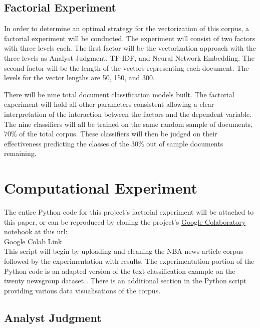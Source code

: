 \documentclass[5p,authoryear]{elsarticle}
\begin{document}
\subsection{Factorial Experiment}\label{dependent}

In order to determine an optimal strategy for the vectorization of this corpus, a factorial experiment will be conducted. The experiment will consist of two factors with three levels each. The first factor will be the vectorization approach with the three levels as Analyst Judgment, TF-IDF, and Neural Network Embedding. The second factor will be the length of the vectors representing each document. The levels for the vector lengths are 50, 150, and 300.

There will be nine total document classification models built. The factorial experiment will hold all other parameters consistent allowing a clear interpretation of the interaction between the factors and the dependent variable. The nine classifiers will all be trained on the same random sample of documents, 70\% of the total corpus. These classifiers will then be judged on their effectiveness predicting the classes of the 30\% out of sample documents remaining.




\section{Computational Experiment}

The entire Python code for this project's factorial experiment will be attached to this paper, or can be reproduced by cloning the project's \href{https://colab.research.google.com/drive/10cnss2COB_KDHCvOy5tJGO7C56wtKYyw}{Google Colaboratory notebook} at this url:\\

\href{https://colab.research.google.com/drive/10cnss2COB_KDHCvOy5tJGO7C56wtKYyw}{Google Colab Link}\\ 

This script will begin by uploading and cleaning the NBA news article corpus followed by the experimentation with results. 
The experimentation portion of the Python code is an adapted version of the text classification example on the twenty newsgroup dataset \citep{sample-code}. 
There is an additional section in the Python script providing various data visualisations of the corpus.


\subsection{Analyst Judgment}\label{judge}
\end{document}
